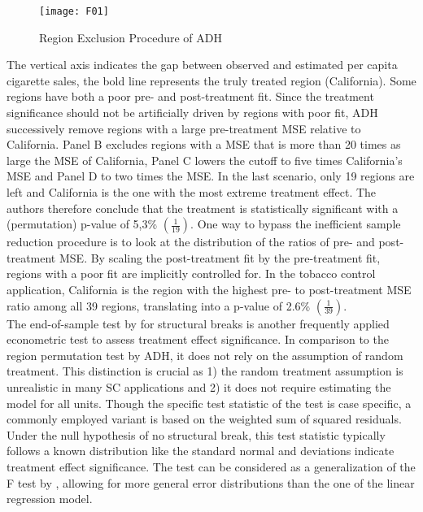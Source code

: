 \begin{figure}[H]
	\centering
	\texttt{[image: F01]}
	\caption{Region Exclusion Procedure of ADH}
	\label{F_01}
\end{figure}

The vertical axis indicates the gap between observed and estimated  per capita cigarette sales, the bold line represents the truly treated region (California). Some regions have both a poor pre- and post-treatment fit. Since the treatment significance should not be artificially driven by regions with poor fit, \ac{ADH} successively remove regions with a large pre-treatment \ac{MSE} relative to California. Panel B excludes regions with a \ac{MSE} that is more than 20 times as large the \ac{MSE} of California, Panel C lowers the cutoff to five times California's \ac{MSE} and Panel D to  two times the \ac{MSE}. In the last scenario, only 19 regions are left and California is the one with the most extreme treatment effect. The authors therefore conclude that the treatment is statistically significant with a (permutation) p-value of 5,3\% $\left(  \frac{1}{19} \right) $. One way to bypass the inefficient sample reduction procedure is to look at the distribution of the ratios of pre- and post-treatment \ac{MSE}. By scaling the post-treatment fit by the pre-treatment fit, regions with a poor fit are implicitly controlled for. In the tobacco control application, California is the region with the highest pre- to post-treatment \ac{MSE} ratio among all 39 regions, translating into a p-value of 2.6\% $\left(  \frac{1}{39} \right) $. \\
The end-of-sample test by \cite{andrews:2003} for structural breaks is another frequently applied econometric test to assess treatment effect significance. In comparison to the region  permutation test by \ac{ADH}, it does not rely on the assumption of random treatment. This distinction is crucial as 1) the random treatment assumption is unrealistic in many \ac{SC}  applications and 2) it does not require estimating the model for all units. Though the specific test statistic of the test is case specific, a commonly employed variant is based on the weighted sum of squared residuals. Under the null hypothesis of no structural break, this test statistic typically follows a known distribution like the standard normal and deviations indicate treatment effect significance. The test can be considered as a generalization of the F test by \cite{chow:1960}, allowing for more general error distributions than the one of the linear regression model.\\
